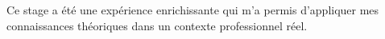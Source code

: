 \documentclass[12pt,a4paper]{report}
\begin{document}
Ce stage a été une expérience enrichissante qui m'a permis d'appliquer mes connaissances théoriques dans un contexte professionnel réel.

\newpage

\tableofcontents

\listoffigures

\listoftables

\newpage


\end{document}
